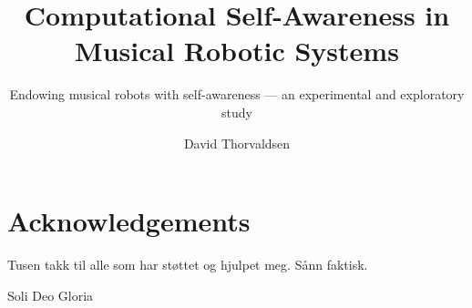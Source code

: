 \title{Computational Self-Awareness in Musical Robotic Systems} %
\subtitle{Endowing musical robots with self-awareness — an experimental and exploratory study} %
\author{David Thorvaldsen}
\duoforside[dept={Institute for Informatics}, program={Informatics: Robotics and Intelligent Systems}, long]

\newpage

\chapter*{Acknowledgements} %
Tusen takk til alle som har støttet og hjulpet meg. Sånn faktisk. \nl

{\huge \gothfamily Soli Deo Gloria}

\newpage

\tableofcontents
\newpage

\listoftables
\newpage

\listoffigures
\newpage

\setcounter{page}{1}